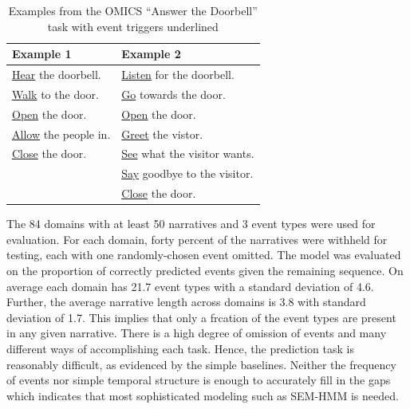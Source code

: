 \documentclass[letterpaper]{article}
\begin{document}
\begin{table}
\footnotesize
\begin{center}
\begin{tabular}{| l | l |}
\hline
Example 1 & Example 2 \\
\hline
\underline{Hear} the doorbell. & \underline{Listen} for the doorbell. \\
\underline{Walk} to the door. & \underline{Go} towards the door. \\
\underline{Open} the door. & \underline{Open} the door. \\
\underline{Allow} the people in. & \underline{Greet} the vistor. \\
\underline{Close} the door. & \underline{See} what the visitor wants. \\
& \underline{Say} goodbye to the visitor. \\
& \underline{Close} the door. \\
\hline
\end{tabular}
\vspace{-3.15mm}
\caption{Examples from the OMICS ``Answer the Doorbell'' task with event triggers underlined}
\end{center}
\label{table:omicsexample}
\end{table}

The 84 domains with at least 50 narratives and 3 event types were used for evaluation.
For each domain, forty percent of the narratives were withheld for testing, each with one randomly-chosen event omitted.  The model was evaluated on the proportion of correctly predicted events given the remaining sequence.
On average each domain has 21.7 event types with a standard deviation of 4.6.  Further, the average narrative length across domains is 3.8 with standard deviation of 1.7.  This implies that
only a frcation of the event types are present in any given narrative.
There is a high degree of omission of events and many different ways of accomplishing each task.
Hence, the prediction task is reasonably difficult, as evidenced by the simple baselines.
Neither the frequency of events nor simple temporal structure is enough to accurately fill in the gaps which indicates that most sophisticated modeling such as SEM-HMM is needed.
\end{document}
